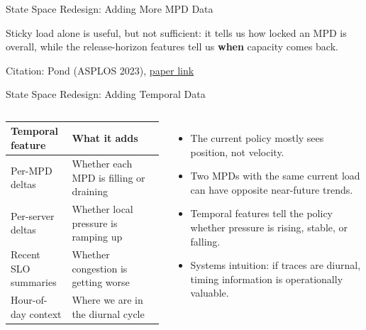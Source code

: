 \documentclass[10pt,aspectratio=169]{beamer}
\begin{document}
\begin{frame}{State Space Redesign: Adding More MPD Data}
  \vspace{0.25em}
  {\scriptsize
  Sticky load alone is useful, but not sufficient: it tells us how locked an MPD is overall, while the release-horizon features tell us \textbf{when} capacity comes back.

  \vspace{0.2em}
  Citation: Pond (ASPLOS 2023), \href{https://pages.cs.wisc.edu/~markhill/papers/asplos2023_pond.pdf}{paper link}}
\end{frame}

\begin{frame}{State Space Redesign: Adding Temporal Data}
  \begin{columns}[T,onlytextwidth]
      \small
      \begin{tabular}{p{0.35\linewidth}p{0.56\linewidth}}
        \toprule
        \textbf{Temporal feature} & \textbf{What it adds} \\
        \midrule
        Per-MPD deltas & Whether each MPD is filling or draining \\
        Per-server deltas & Whether local pressure is ramping up \\
        Recent SLO summaries & Whether congestion is getting worse \\
        Hour-of-day context & Where we are in the diurnal cycle \\
        \bottomrule
      \end{tabular}
      \begin{itemize}
        \item The current policy mostly sees position, not velocity.
        \item Two MPDs with the same current load can have opposite near-future trends.
        \item Temporal features tell the policy whether pressure is rising, stable, or falling.
        \item Systems intuition: if traces are diurnal, timing information is operationally valuable.
      \end{itemize}
  \end{columns}
\end{frame}
\end{document}
